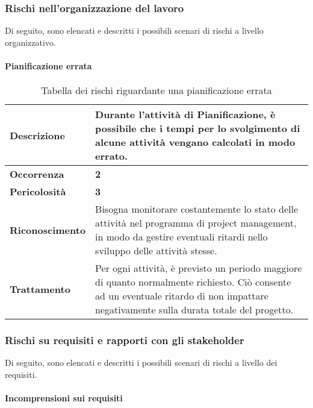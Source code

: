 \subsubsection{Rischi nell'organizzazione del lavoro}

Di seguito, sono elencati e descritti i possibili scenari di rischi a livello organizzativo.

\paragraph{Pianificazione errata}

\begin{table}[H]
	\begin{center}
		\begin{tabular}{|l | p{11cm}|}
			\hline
			\textbf{Descrizione}	& Durante l'attività di Pianificazione, è possibile che i tempi per lo svolgimento di alcune attività vengano calcolati in modo errato. \\
			\hline
			\textbf{Occorrenza}	&	\textbf{2}	\\
			\hline
			\textbf{Pericolosità}	&	\textbf{3}	\\
			\hline
			\textbf{Riconoscimento}	&	Bisogna monitorare costantemente lo stato delle attività nel programma di project management, in modo da gestire eventuali ritardi nello sviluppo delle attività stesse.	\\
			\hline
			\textbf{Trattamento}	&	Per ogni attività, è previsto un periodo maggiore di quanto normalmente richiesto. Ciò consente ad un eventuale ritardo di non impattare negativamente sulla durata totale del progetto.	\\
			\hline
		\end{tabular}
		\caption{Tabella dei rischi riguardante una pianificazione errata}
	\end{center}
\end{table}

\subsubsection{Rischi su requisiti e rapporti con gli stakeholder}

Di seguito, sono elencati e descritti i possibili scenari di rischi a livello dei requisiti.

\paragraph{Incomprensioni sui requisiti}


